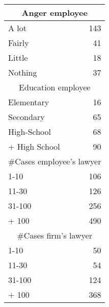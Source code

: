 \begin{tabular}{rr}
\toprule
\multicolumn{2}{c}{Anger employee} \\
\midrule
\multicolumn{1}{l}{A lot} & 143 \\
\multicolumn{1}{l}{Fairly} & 41 \\
\multicolumn{1}{l}{Little } & 18 \\
\multicolumn{1}{l}{Nothing} & 37 \\
\multicolumn{2}{c}{Education employee} \\
\multicolumn{1}{l}{Elementary} & 16 \\
\multicolumn{1}{l}{Secondary} & 65 \\
\multicolumn{1}{l}{High-School} & 68 \\
\multicolumn{1}{l}{+ High School} & 90 \\
\multicolumn{2}{c}{\#Cases employee's lawyer} \\
\multicolumn{1}{l}{1-10} & 106 \\
\multicolumn{1}{l}{11-30} & 126 \\
\multicolumn{1}{l}{31-100} & 256 \\
\multicolumn{1}{l}{+ 100} & 490 \\
\multicolumn{2}{c}{\#Cases firm's lawyer} \\
\multicolumn{1}{l}{1-10} & 50 \\
\multicolumn{1}{l}{11-30} & 54 \\
\multicolumn{1}{l}{31-100} & 124 \\
\multicolumn{1}{l}{+ 100} & 368 \\
\bottomrule
\end{tabular}%
